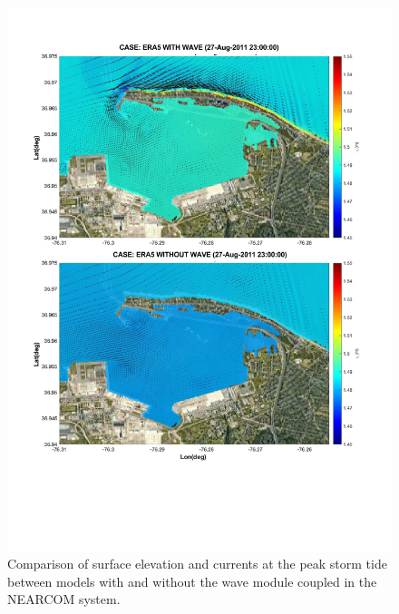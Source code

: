 \documentclass[preprint,12pt,authoryear] {elsarticle}
\begin{document}
\begin{figure}
\centering
\includegraphics[width=\textwidth]{./figures/nearcom_wo_wave.pdf}
\caption{Comparison of surface elevation and currents at the peak storm tide between models with and without the wave module coupled in the NEARCOM system.}
\label{ERA5_eta_wo_wave}
\centering
\end{figure}
\end{document}
